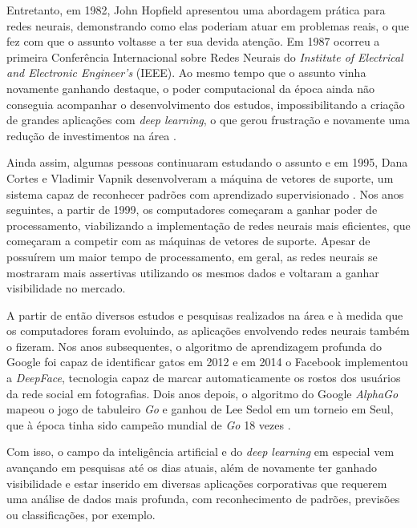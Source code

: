 \par Entretanto, em 1982, John Hopfield apresentou uma abordagem prática para redes neurais, demonstrando como elas poderiam atuar em problemas reais, o que fez com que o assunto voltasse a ter sua devida atenção. Em 1987 ocorreu a primeira Conferência Internacional sobre Redes Neurais do \textit{Institute of Electrical and Electronic Engineer’s} (IEEE). Ao mesmo tempo que o assunto vinha novamente ganhando destaque, o poder computacional da época ainda não conseguia acompanhar o desenvolvimento dos estudos, impossibilitando a criação de grandes aplicações com \textit{deep learning}, o que gerou frustração e novamente uma redução de investimentos na área \cite{Academy2019}.

\par Ainda assim, algumas pessoas continuaram estudando o assunto e em 1995, Dana Cortes e Vladimir Vapnik desenvolveram a máquina de vetores de suporte, um sistema capaz de reconhecer padrões com aprendizado supervisionado \cite{Foote2019}. Nos anos seguintes, a partir de 1999, os computadores começaram a ganhar poder de processamento, viabilizando a implementação de redes neurais mais eficientes, que começaram a competir com as máquinas de vetores de suporte. Apesar de possuírem um maior tempo de processamento, em geral, as redes neurais se mostraram mais assertivas utilizando os mesmos dados e voltaram a ganhar visibilidade no mercado.

\par A partir de então diversos estudos e pesquisas realizados na área e à medida que os computadores foram evoluindo, as aplicações envolvendo redes neurais também o fizeram. Nos anos subsequentes, o algoritmo de aprendizagem profunda do Google foi capaz de identificar gatos em 2012 e em 2014 o Facebook implementou a \textit{DeepFace}, tecnologia capaz de marcar automaticamente os rostos dos usuários da rede social em fotografias. Dois anos depois, o algoritmo do Google \textit{AlphaGo} mapeou o jogo de tabuleiro \textit{Go} e ganhou de Lee Sedol em um torneio em Seul, que à época tinha sido campeão mundial de \textit{Go} 18 vezes \cite{Academy2019}.

\par Com isso, o campo da inteligência artificial e do \textit{deep learning} em especial vem avançando em pesquisas até os dias atuais, além de novamente ter ganhado visibilidade e estar inserido em diversas aplicações corporativas que requerem uma análise de dados mais profunda, com reconhecimento de padrões, previsões ou classificações, por exemplo.

